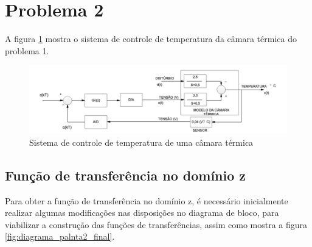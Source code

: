 \documentclass[a4paper,12pt]{article}
\begin{document}
	\section{Problema 2}
		A figura \ref{fig:plantaproblema2} mostra o sistema de controle de temperatura da câmara térmica do problema 1.
		
		\begin{figure}[H]
			\centering
			\includegraphics[width=0.9\linewidth]{images/planta_problema2.png}
			\caption{Sistema de controle de temperatura de uma câmara térmica}
			\label{fig:plantaproblema2}
		\end{figure}
	
		\subsection{Função de transferência no domínio z}	
			Para obter a função de transferência no domínio z, é necessário inicialmente realizar algumas modificações nas disposições no diagrama de bloco, para viabilizar a construção das funções de transferências, assim como mostra a figura \ref{fig:diagrama_palnta2_final}.
\end{document}
